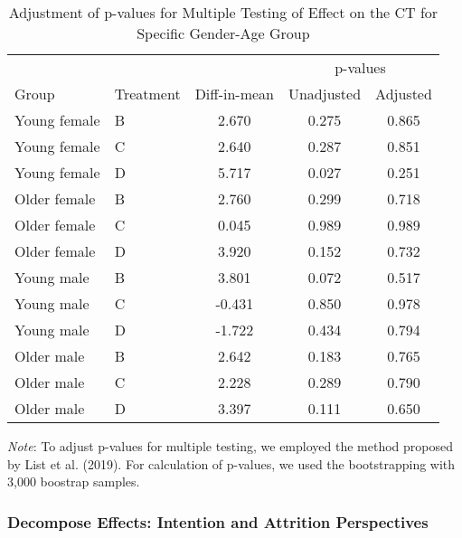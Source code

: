 \documentclass[12pt, a4paper]{article}
\begin{document}
\begin{table}[H]

\caption{\label{tab:mh-adjust-gender-age-test}Adjustment of p-values for Multiple Testing of Effect on the CT for Specific Gender-Age Group}
\centering
\fontsize{8}{10}\selectfont
\begin{threeparttable}
\begin{tabular}[t]{llccc}
\toprule
\multicolumn{3}{c}{ } & \multicolumn{2}{c}{p-values} \\
\cmidrule(l{3pt}r{3pt}){4-5}
Group & Treatment & Diff-in-mean & Unadjusted & Adjusted\\
\midrule
Young female & B & 2.670 & 0.275 & 0.865\\
Young female & C & 2.640 & 0.287 & 0.851\\
Young female & D & 5.717 & 0.027 & 0.251\\
Older female & B & 2.760 & 0.299 & 0.718\\
Older female & C & 0.045 & 0.989 & 0.989\\
Older female & D & 3.920 & 0.152 & 0.732\\
Young male & B & 3.801 & 0.072 & 0.517\\
Young male & C & -0.431 & 0.850 & 0.978\\
Young male & D & -1.722 & 0.434 & 0.794\\
Older male & B & 2.642 & 0.183 & 0.765\\
Older male & C & 2.228 & 0.289 & 0.790\\
Older male & D & 3.397 & 0.111 & 0.650\\
\bottomrule
\end{tabular}
\begin{tablenotes}
\item \emph{Note}: To adjust p-values for multiple testing, we employed the method proposed by List et al. (2019). For calculation of p-values, we used the bootstrapping with 3,000 boostrap samples.
\end{tablenotes}
\end{threeparttable}
\end{table}

\hypertarget{decompose-effects-intention-and-attrition-perspectives}{%
\subsubsection{Decompose Effects: Intention and Attrition Perspectives}\label{decompose-effects-intention-and-attrition-perspectives}}
\end{document}
